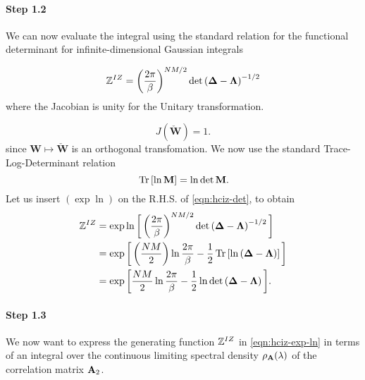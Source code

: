 \paragraph{Step 1.2}

We can now evaluate the
integral using the standard relation for the functional determinant for infinite-dimensional Gaussian integrals~\cite{EngelAndVanDenBroeck}

\begin{equation}
\label{eqn:hciz-det}
    \mathbb{Z}^{IZ}=\left(\dfrac{2\pi}{\beta}\right)^{NM/2}\det\left(\mathbf{\Delta}-\mathbf{\Lambda}\right)^{-1/2}
\end{equation}
where the Jacobian is unity for the Unitary transformation.

\begin{equation}\label{eqn:Jacobian}
    J(\mathbf{\check{W}})=1  .
\end{equation}
since $\mathbf{W} \mapsto \check{\mathbf{W}}$  is an orthogonal transfomation.
We now use the standard Trace-Log-Determinant relation~\cite{EngelAndVanDenBroeck}
\begin{equation}\label{eqn:tr-ln-det}
    \mbox{}\operatorname{Tr}\left[\ln\mathbf{M}\right]=\ln\det\mathbf{M}  .
\end{equation}
Let us insert $(\exp\ln)$ on the R.H.S. of \ref{eqn:hciz-det}, to obtain
\begin{align}
\nonumber
\mathbb{Z}^{IZ}
  &=\exp\ln\bigg[\left(\dfrac{2\pi}{\beta}\right)^{NM/2}\det\left(\mathbf{\Delta}-\mathbf{\Lambda}\right)^{-1/2}\bigg] \\ 
\nonumber
  & =\exp\bigg[\left(\dfrac{NM}{2}\right)\ln\dfrac{2\pi}{\beta}-\dfrac{1}{2}\mbox{}\operatorname{Tr}\left[\ln\left(\mathbf{\Delta}-\mathbf{\Lambda}
\right)\right]\bigg] \\ 
\label{eqn:hciz-exp-ln}
  & =\exp\bigg[\dfrac{NM}{2}\ln\dfrac{2\pi}{\beta}-\dfrac{1}{2}\ln\det\left(\mathbf{\Delta}-\mathbf{\Lambda}\right)\bigg]  .
\end{align}


\paragraph{Step 1.3}
We now want to express
the generating function $\mathbb{Z}^{IZ}$ 
in \ref{eqn:hciz-exp-ln}
in terms of an integral over the continuous limiting spectral density
$\rho_{\mathbf{A}}(\lambda)$ of the correlation matrix $\mathbf{A}_{2}$.  

